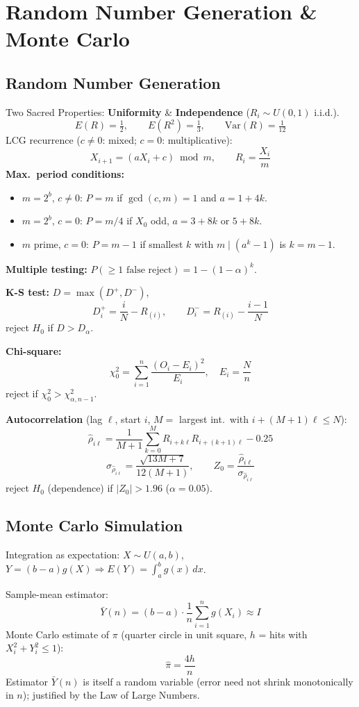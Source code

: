 \section{Random Number Generation \& Monte Carlo}

\subsection{Random Number Generation}
\begin{formulabox}
Two Sacred Properties: \textbf{Uniformity} \& \textbf{Independence} ($R_i\sim U(0,1)$ i.i.d.).
\[
E(R)=\tfrac12, \qquad E(R^2)=\tfrac13, \qquad \mathrm{Var}(R)=\tfrac{1}{12}
\]
LCG recurrence ($c\neq0$: mixed; $c=0$: multiplicative):
\[
X_{i+1} = (aX_i+c)\bmod m, \qquad R_i = \frac{X_i}{m}
\]
\textbf{Max.\ period conditions:}
\begin{itemize}
\item $m=2^b,\,c\neq0$: $P=m$ if $\gcd(c,m)=1$ and $a=1+4k$.
\item $m=2^b,\,c=0$: $P=m/4$ if $X_0$ odd, $a=3{+}8k$ or $5{+}8k$.
\item $m$ prime, $c=0$: $P=m-1$ if smallest $k$ with $m\mid(a^k-1)$ is $k=m-1$.
\end{itemize}
\textbf{Multiple testing:} $P(\ge1 \text{ false reject}) = 1-(1-\alpha)^k$.

\textbf{K-S test:} $D=\max(D^+,D^-)$,
\[
D^+_i = \frac{i}{N}-R_{(i)}, \qquad D^-_i = R_{(i)}-\frac{i-1}{N}
\]
reject $H_0$ if $D>D_\alpha$.

\textbf{Chi-square:}
\[
\chi_0^2 = \sum_{i=1}^n \frac{(O_i-E_i)^2}{E_i}, \quad E_i=\frac{N}{n}
\]
reject if $\chi_0^2>\chi^2_{\alpha,n-1}$.

\textbf{Autocorrelation} (lag $\ell$, start $i$, $M{=}$ largest int.\ with $i+(M{+}1)\ell\le N$):
\[
\hat\rho_{i\ell} = \frac{1}{M+1}\sum_{k=0}^M R_{i+k\ell}R_{i+(k+1)\ell} - 0.25
\]
\[
\sigma_{\hat\rho_{i\ell}} = \frac{\sqrt{13M+7}}{12(M+1)}, \qquad Z_0 = \frac{\hat\rho_{i\ell}}{\sigma_{\hat\rho_{i\ell}}}
\]
reject $H_0$ (dependence) if $|Z_0|>1.96$ ($\alpha=0.05$).
\end{formulabox}

\subsection{Monte Carlo Simulation}
\begin{formulabox}
Integration as expectation: $X\sim U(a,b)$, $Y=(b-a)g(X) \Rightarrow E(Y)=\int_a^b g(x)\,dx$.

Sample-mean estimator:
\[
\bar Y(n) = (b-a)\cdot\frac1n\sum_{i=1}^n g(X_i) \approx I
\]
Monte Carlo estimate of $\pi$ (quarter circle in unit square, $h$ = hits with $X_i^2+Y_i^2\le1$):
\[
\hat\pi = \frac{4h}{n}
\]
Estimator $\bar Y(n)$ is itself a random variable (error need not shrink monotonically in $n$); justified by the Law of Large Numbers.
\end{formulabox}
